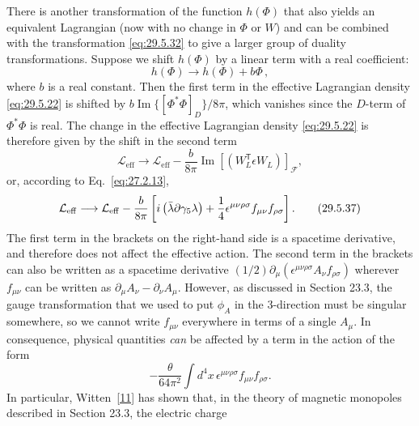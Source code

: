 There is another transformation of the function \(h(\Phi)\) that also yields
an equivalent Lagrangian (now with no change in \(\Phi\) or \(W\)) and can be
combined with the transformation \eqref{eq:29.5.32} to give a larger group of
duality transformations. Suppose we shift \(h(\Phi)\) by a linear term with
a real coefficient:
\begin{equation}
  h(\Phi)\longrightarrow h(\Phi)+b\Phi\,,
  \tag{29.5.35}\label{eq:29.5.35}
\end{equation}
where \(b\) is a real constant. Then the first term in the effective
Lagrangian density \eqref{eq:29.5.22} is shifted by
\(b\operatorname{Im}\{[\Phi^*\Phi]_D\}/8\pi\), which vanishes since the
\(D\)-term of \(\Phi^*\Phi\) is real. The change in the effective Lagrangian
density \eqref{eq:29.5.22} is therefore given by the shift in the second term
\begin{equation}
  \mathcal{L}_{\mathrm{eff}}\longrightarrow\mathcal{L}_{\mathrm{eff}}
  -\frac{b}{8\pi}\operatorname{Im}
    \left[\left(W_L^{\mathsf T}\epsilon W_L\right)\right]_{\mathcal F},
  \tag{29.5.36}\label{eq:29.5.36}
\end{equation}
or, according to Eq.~\eqref{eq:27.2.13},
\begin{equation}
  \mathcal{L}_{\mathrm{eff}}\longrightarrow\mathcal{L}_{\mathrm{eff}}
  -\frac{b}{8\pi}\left[
    i\left(\bar\lambda\sl{\partial}\gamma_5\lambda\right)
    +\frac14\epsilon^{\mu\nu\rho\sigma}f_{\mu\nu}f_{\rho\sigma}
  \right].
  \tag{29.5.37}\label{eq:29.5.37}
\end{equation}
The first term in the brackets on the right-hand side is a spacetime
derivative, and therefore does not affect the effective action. The second
term in the brackets can also be written as a spacetime derivative
\((1/2)\partial_\mu(\epsilon^{\mu\nu\rho\sigma}A_\nu f_{\rho\sigma})\)
wherever \(f_{\mu\nu}\) can be written as
\(\partial_\mu A_\nu-\partial_\nu A_\mu\). However, as discussed in Section
23.3, the gauge transformation that we used to put \(\phi_A\) in the
3-direction must be singular somewhere, so we cannot write \(f_{\mu\nu}\)
everywhere in terms of a single \(A_\mu\). In consequence, physical
quantities \textit{can} be affected by a term in the action of the form
\begin{equation}
  -\frac{\theta}{64\pi^2}\int d^4x\,
    \epsilon^{\mu\nu\rho\sigma}f_{\mu\nu}f_{\rho\sigma}.
  \tag{29.5.38}\label{eq:29.5.38}
\end{equation}
In particular, Witten~\hyperref[ch29-ref-11]{[11]} has shown that, in the
theory of magnetic monopoles described in Section 23.3, the electric charge
